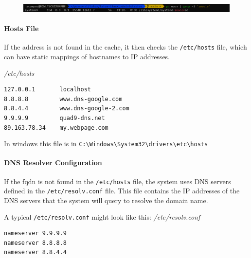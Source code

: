 \documentclass{article}
\newenvironment{blocktemplate}[1]{%
    \tcolorbox[beamer,%
    noparskip,breakable,
    colframe=Blue,%
    colbacklower=LimeGreen!75!LightGreen,%
    title=#1]}%
    {\endtcolorbox}
\newenvironment{codetemplate}[1][]{%
  \mybasecolorbox[#1]
  \itshape
}{%
  \endmybasecolorbox
}
\begin{document}
\begin{figure}[H]
    \includegraphics[width=\textwidth]{pictures/resolved.png}
    \centering
\end{figure}

\paragraph{Hosts File}
If the address is not found in the cache, it then checks the \verb|/etc/hosts| file, which can have static mappings of hostnames to IP addresses.

\begin{codetemplate}{/etc/hosts}
\begin{verbatim}
127.0.0.1       localhost
8.8.8.8         www.dns-google.com
8.8.4.4         www.dns-google-2.com
9.9.9.9         quad9-dns.net
89.163.78.34    my.webpage.com
\end{verbatim}
\end{codetemplate}

\begin{blocktemplate}{Note}
In windows this file is in \verb|C:\Windows\System32\drivers\etc\hosts|
\end{blocktemplate}

\paragraph{DNS Resolver Configuration}
If the fqdn is not found in the \verb+/etc/hosts+ file, the system uses DNS servers defined in the \verb+/etc/resolv.conf+ file. This file contains the IP addresses of the DNS servers that the system will query to resolve the domain name.

A typical \verb+/etc/resolv.conf+ might look like this:
\begin{codetemplate}{/etc/resolv.conf}
\begin{verbatim}
nameserver 9.9.9.9
nameserver 8.8.8.8
nameserver 8.8.4.4
\end{verbatim}
\end{codetemplate}
\end{document}
